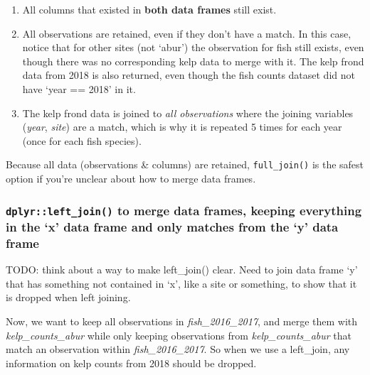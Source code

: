 \documentclass[]{book}
\newenvironment{Shaded}{\begin{snugshade}}{\end{snugshade}}
\newcommand{\DecValTok}[1]{\textcolor[rgb]{0.00,0.00,0.81}{#1}}
\newcommand{\KeywordTok}[1]{\textcolor[rgb]{0.13,0.29,0.53}{\textbf{#1}}}
\newcommand{\NormalTok}[1]{#1}
\newcommand{\OperatorTok}[1]{\textcolor[rgb]{0.81,0.36,0.00}{\textbf{#1}}}
\newcommand{\StringTok}[1]{\textcolor[rgb]{0.31,0.60,0.02}{#1}}
\providecommand{\tightlist}{%
  \setlength{\itemsep}{0pt}\setlength{\parskip}{0pt}}
\begin{document}
\begin{enumerate}
\def\labelenumi{\arabic{enumi}.}
\tightlist
\item
  All columns that existed in \textbf{both data frames} still exist.
\item
  All observations are retained, even if they don't have a match. In this case, notice that for other sites (not `abur') the observation for fish still exists, even though there was no corresponding kelp data to merge with it. The kelp frond data from 2018 is also returned, even though the fish counts dataset did not have `year == 2018' in it.
\item
  The kelp frond data is joined to \emph{all observations} where the joining variables (\emph{year}, \emph{site}) are a match, which is why it is repeated 5 times for each year (once for each fish species).
\end{enumerate}

Because all data (observations \& columns) are retained, \texttt{full\_join()} is the safest option if you're unclear about how to merge data frames.

\hypertarget{dplyrleft_join-to-merge-data-frames-keeping-everything-in-the-x-data-frame-and-only-matches-from-the-y-data-frame}{%
\subsubsection{\texorpdfstring{\texttt{dplyr::left\_join()} to merge data frames, keeping everything in the `x' data frame and only matches from the `y' data frame}{dplyr::left\_join() to merge data frames, keeping everything in the `x' data frame and only matches from the `y' data frame}}\label{dplyrleft_join-to-merge-data-frames-keeping-everything-in-the-x-data-frame-and-only-matches-from-the-y-data-frame}}

TODO: think about a way to make left\_join() clear. Need to join data frame `y' that has something not contained in `x', like a site or something, to show that it is dropped when left joining.

Now, we want to keep all observations in \emph{fish\_2016\_2017}, and merge them with \emph{kelp\_counts\_abur} while only keeping observations from \emph{kelp\_counts\_abur} that match an observation within \emph{fish\_2016\_2017}. So when we use a left\_join, any information on kelp counts from 2018 should be dropped.

\begin{Shaded}
\end{Shaded}
\end{document}
